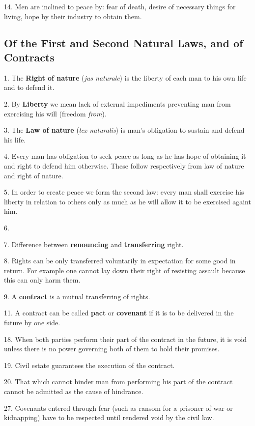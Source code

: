 14. Men are inclined to peace by: fear of death, desire of necessary things
for living, hope by their industry to obtain them.

\subsection{Of the First and Second Natural Laws, and of Contracts}

1. The \textbf{Right of nature} (\textit{jus naturale}) is the liberty of each
man to his own life and to defend it.

2. By \textbf{Liberty} we mean lack of external impediments preventing man from
exercising his will (freedom \textit{from}).

3. The \textbf{Law of nature} (\textit{lex naturalis}) is man's obligation to
sustain and defend his life.

4. Every man has obligation to seek peace as long as he has hope of obtaining
it and right to defend him otherwise. These follow respectively from law of
nature and right of nature.

5. In order to create peace we form the second law: every man shall exercise
his liberty in relation to others only as much as he will allow it to be
exercised againt him.

6.

7. Difference between \textbf{renouncing} and \textbf{transferring} right.

8. Rights can be only transferred voluntarily in expectation for some good in
return. For example one cannot lay down their right of resisting assault
because this can only harm them.

9. A \textbf{contract} is a mutual transferring of rights.

11. A contract can be called \textbf{pact} or \textbf{covenant} if it is to be
delivered in the future by one side.

18. When both parties perform their part of the contract in the future, it is
void unless there is no power governing both of them to hold their promises.

19. Civil estate guarantees the execution of the contract.

20. That which cannot hinder man from performing his part of the contract
cannot be admitted as the cause of hindrance.

27. Covenants entered through fear (such as ransom for a prisoner of war or
kidnapping) have to be respected until rendered void by the civil law.

